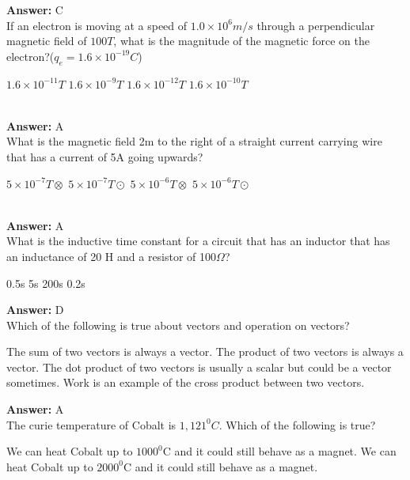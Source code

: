 \documentclass[12pt,addpoints]{exam}
\begin{document}
{{{\begin{questions}
					\textbf{Answer:} C\\ 
					\question If an electron is moving at a speed of $1.0\times10^{6}m/s$ through a perpendicular magnetic field of $100T$, what is the magnitude of the magnetic force on the electron?($q_e=1.6\times10^{-19}C$) \\
					\begin{oneparchoices}
						\choice $1.6\times10^{-11}T$
						\choice $1.6\times10^{-9}T$
						\choice $1.6\times10^{-12}T$
						\choice $1.6\times10^{-10}T$
					\end{oneparchoices}
					\\ \textbf{Answer:} A\\ 
					\question What is the magnetic field 2m to the right of a straight current carrying wire that has a current of 5A going upwards? \\
					\begin{oneparchoices}
						\choice $5\times10^{-7}T\otimes$
						\choice $5\times10^{-7}T\odot$
						\choice $5\times10^{-6}T\otimes$
						\choice $5\times10^{-6}T\odot$
					\end{oneparchoices}
					\\ \textbf{Answer:} A\\ 
					\question What is the inductive time constant for a circuit that has an inductor that has an inductance of 20 H and a resistor of 100$\Omega$? \\
					\begin{oneparchoices}
						\choice 0.5s
						\choice 5s
						\choice 200s
						\choice 0.2s
					\end{oneparchoices}
					\textbf{Answer:} D\\ 
					\question Which of the following is true about vectors and operation on vectors? 
					\begin{choices}
						\choice The sum of two vectors is always a vector.
						\choice The product of two vectors is always a vector.
						\choice The dot product of two vectors is usually a scalar but could be a vector sometimes.
						\choice Work is an example of the cross product between two vectors.
					\end{choices}
					\textbf{Answer:} A\\ 
					\question The curie temperature of Cobalt is $1,121^{0}C$. Which of the following is true?
					\begin{choices}
						\choice We can heat Cobalt up to $1000^0$C and it could still behave as a magnet.
						\choice We can heat Cobalt up to $2000^0$C and it could still behave as a magnet.

\end{choices}
\end{questions}}}}
\end{document}
